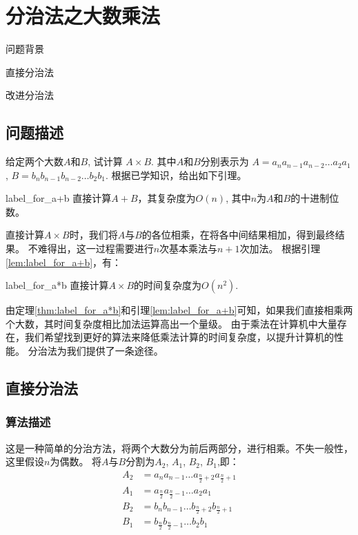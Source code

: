 \chapter{分治法之大数乘法}
\begin{introduction}
	\item 问题背景
	\item 直接分治法
	\item 改进分治法
\end{introduction}

\section{问题描述}
给定两个大数$A$和$B$, 试计算
\begin{math}
	A \times B
\end{math}.
其中$A$和$B$分别表示为
\begin{math}
	A = a_n a_{n-1} a_{n-2} \ldots a_2 a_1
\end{math}
,
\begin{math}
	B = b_n b_{n-1} b_{n-2} \ldots b_2 b_1
\end{math}.
根据已学知识，给出如下引理。

\begin{lemma}{}{label_for_a+b}
	直接计算$A + B$，其复杂度为$O(n)$, 其中$n$为$A$和$B$的十进制位数。
\end{lemma}

直接计算$A \times B$时，我们将$A$与$B$的各位相乘，在将各中间结果相加，得到最终结果。
不难得出，这一过程需要进行$n$次基本乘法与$n+1$次加法。
根据引理\ref{lem:label_for_a+b}，有：
\begin{theorem}{}{label_for_a*b}
	直接计算$A \times B$的时间复杂度为$O(n^2)$.
\end{theorem}

由定理\ref{thm:label_for_a*b}和引理\ref{lem:label_for_a+b}可知，如果我们直接相乘两个大数，其时间复杂度相比加法运算高出一个量级。
由于乘法在计算机中大量存在，我们希望找到更好的算法来降低乘法计算的时间复杂度，以提升计算机的性能。
分治法为我们提供了一条途径。
\section{直接分治法}
\subsection{算法描述}
这是一种简单的分治方法，将两个大数分为前后两部分，进行相乘。不失一般性，这里假设$n$为偶数。
将$A$与$B$分割为$A_2$, $A_1$, $B_2$, $B_1$,即：
\begin{displaymath}
	\begin{split}
		A_2 &= a_{n} a_{n-1} \ldots a_{\frac{n}{2} + 2} a_{\frac{n}{2} + 1}\\
		A_1 &= a_{\frac{n}{2}} a_{\frac{n}{2} - 1} \ldots a_2 a_1\\
		B_2 &= b_{n} b_{n-1} \ldots b_{\frac{n}{2} + 2} b_{\frac{n}{2} + 1}\\
		B_1 &= b_{\frac{n}{2}} b_{\frac{n}{2} - 1} \ldots b_2 b_1
	\end{split}
\end{displaymath}

